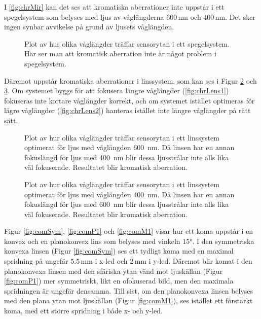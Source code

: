 \documentclass[a4paper]{article}
\newcommand{\unit}[1]{\ensuremath{\,\mathrm{#1}}}
\begin{document}
I \autoref{fig:chrMir} kan det ses att kromatiska aberrationer inte uppstår i ett spegelsystem som belyses med ljus av våglängderna $600\unit{nm}$ och $400\unit{nm}$. Det sker ingen synbar avvikelse på grund av ljusets våglängden.

\FloatBarrier
\begin{figure}[h]
	\centering
	
	\caption{Plot av hur olika våglängder träffar sensorytan i ett spegelsystem. Här ser man att kromatisk aberration inte är något problem i spegelsystem.}
	\label{fig:chrMir}
\end{figure}
\FloatBarrier

Däremot uppstår kromatiska aberrationer i linssystem, som kan ses i Figur \ref{fig:chrLens1} och \ref{fig:chrLens2}. Om systemet byggs för att fokusera längre våglängder (\autoref{fig:chrLens1}) fokuseras inte kortare våglängder korrekt, och om systemet istället optimeras för lägre våglängder (\autoref{fig:chrLens2}) hanteras istället inte längre våglängder på rätt sätt.

\FloatBarrier
\begin{figure}[h]
	\centering
	
	\caption{Plot av hur olika våglängder träffar sensorytan i ett linssystem optimerat för ljus med våglängden \SI{600}{\nano\meter}. Då linsen har en annan fokuslängd för ljus med \SI{400}{\nano\meter} blir dessa ljusstrålar inte alls lika väl fokuserade. Resultatet blir kromatisk aberration.}
	\label{fig:chrLens1}
\end{figure}
\begin{figure}[h]
	\centering
	
	\caption{Plot av hur olika våglängder träffar sensorytan i ett linssystem optimerat för ljus med våglängden \SI{400}{\nano\meter}. Då linsen har en annan fokuslängd för ljus med \SI{600}{\nano\meter} blir dessa ljusstrålar inte alls lika väl fokuserade. Resultatet blir kromatisk aberration.}
	\label{fig:chrLens2}
\end{figure}
\FloatBarrier

Figur \ref{fig:comSym}, \ref{fig:comP1} och \ref{fig:comM1} visar hur ett koma uppstår i en konvex och en planokonvex lins som belyses med vinkeln $15\si{\degree}$. I den symmetriska konvexa linsen (Figur \ref{fig:comSym}) ses ett tydligt koma med en maximal spridning på ungefär $5.5\unit{mm}$ i x-led och $2\unit{mm}$ i y-led. Däremot blir komat i den planokonvexa linsen med den sfäriska ytan vänd mot ljuskällan (Figur \ref{fig:comP1}) mer symmetriskt, likt en ofokuserad bild, men den maximala spridningen är ungefär densamma. Till sist, om den planokonvexa linsen belyses med den plana ytan mot ljuskällan (Figur \ref{fig:comM1}), ses istället ett förstärkt koma, med ett större spridning i både x- och y-led.
\end{document}
